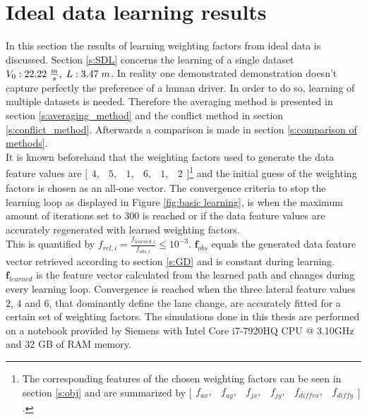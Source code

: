 \section{Ideal data learning results} \label{s:ID_results}
In this section the results of learning weighting factors from ideal data is discussed.
Section \ref{s:SDL} concerns the learning of a single dataset $V_0:22.22\hspace{1mm}\frac{m}{s},\hspace{1mm} L:3.47\hspace{1mm}m$. In reality one demonstrated demonstration doesn't capture perfectly the preference of a human driver. In order to do so, learning of multiple datasets is needed. Therefore the averaging method is presented in section \ref{s:averaging_method} and the conflict method in section \ref{s:conflict_method}. Afterwards a comparison is made in section \ref{s:comparison of methods}.\\

It is known beforehand that the weighting factors used to generate the data feature values are  $\bigl[ \begin{smallmatrix} 4,&5,&1,&6,&1,&2\end{smallmatrix}\bigr]$\footnote{The corresponding features  of the chosen weighting factors can be seen in section \ref{s:obj} and are summarized by $\bigl[ \begin{smallmatrix} f_{ax},&f_{ay},&f_{jx},&f_{jy},&f_{diff vx},&f_{diff y}\end{smallmatrix}\bigr]$.} and the initial guess of the weighting factors is chosen as an all-one vector. The convergence criteria to stop the learning loop as displayed in Figure \ref{fig:basic learning}, is when the maximum amount of iterations set to $300$ is reached or if the data feature values are accurately regenerated with learned weighting factors.\\
This is quantified by $f_{rel,i} = \frac{f_{learned,i}}{f_{obs,i}} \leq 10^{-3}$.  $\bm{f}_{obs}$ equals the generated data feature vector retrieved according to section \ref{s:GD} and is constant during learning. $\bm{f}_{learned}$ is the feature vector calculated from the learned path and changes during every learning loop. Convergence is reached when the three lateral feature values $2$, $4$ and $6$, that dominantly define the lane change, are accurately fitted for a certain set of weighting factors. The simulations done in this thesis are performed on a notebook provided by Siemens with Intel Core i7-7920HQ CPU @ 3.10GHz and 32 GB of RAM memory.\\
		
